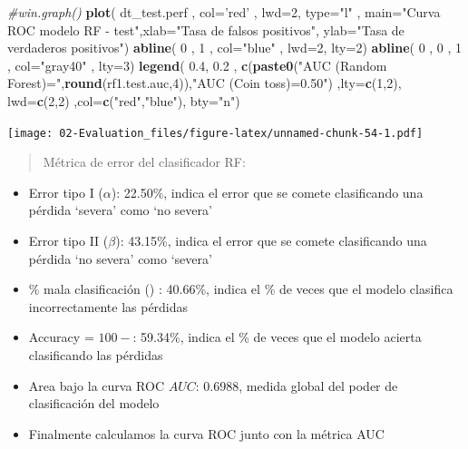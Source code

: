 \documentclass[]{book}
\newenvironment{Shaded}{\begin{snugshade}}{\end{snugshade}}
\newcommand{\CommentTok}[1]{\textcolor[rgb]{0.56,0.35,0.01}{\textit{#1}}}
\newcommand{\DataTypeTok}[1]{\textcolor[rgb]{0.13,0.29,0.53}{#1}}
\newcommand{\DecValTok}[1]{\textcolor[rgb]{0.00,0.00,0.81}{#1}}
\newcommand{\FloatTok}[1]{\textcolor[rgb]{0.00,0.00,0.81}{#1}}
\newcommand{\KeywordTok}[1]{\textcolor[rgb]{0.13,0.29,0.53}{\textbf{#1}}}
\newcommand{\NormalTok}[1]{#1}
\newcommand{\StringTok}[1]{\textcolor[rgb]{0.31,0.60,0.02}{#1}}
\providecommand{\tightlist}{%
  \setlength{\itemsep}{0pt}\setlength{\parskip}{0pt}}
\begin{document}
\begin{Shaded}
\begin{Highlighting}[]
\CommentTok{#win.graph()}
\KeywordTok{plot}\NormalTok{( dt_test.perf , }\DataTypeTok{col=}\StringTok{'red'}\NormalTok{ , }\DataTypeTok{lwd=}\DecValTok{2}\NormalTok{, }\DataTypeTok{type=}\StringTok{"l"}\NormalTok{ , }\DataTypeTok{main=}\StringTok{"Curva ROC modelo RF - test"}\NormalTok{,}\DataTypeTok{xlab=}\StringTok{"Tasa de falsos positivos"}\NormalTok{, }\DataTypeTok{ylab=}\StringTok{"Tasa de verdaderos positivos"}\NormalTok{)}
\KeywordTok{abline}\NormalTok{( }\DecValTok{0}\NormalTok{ , }\DecValTok{1}\NormalTok{  , }\DataTypeTok{col=}\StringTok{"blue"}\NormalTok{ , }\DataTypeTok{lwd=}\DecValTok{2}\NormalTok{, }\DataTypeTok{lty=}\DecValTok{2}\NormalTok{)}
\KeywordTok{abline}\NormalTok{( }\DecValTok{0}\NormalTok{ , }\DecValTok{0}\NormalTok{ , }\DecValTok{1}\NormalTok{ , }\DataTypeTok{col=}\StringTok{"gray40"}\NormalTok{   , }\DataTypeTok{lty=}\DecValTok{3}\NormalTok{)}
\KeywordTok{legend}\NormalTok{( }\FloatTok{0.4}\NormalTok{, }\FloatTok{0.2}\NormalTok{ , }\KeywordTok{c}\NormalTok{(}\KeywordTok{paste0}\NormalTok{(}\StringTok{"AUC (Random Forest)="}\NormalTok{,}\KeywordTok{round}\NormalTok{(rf1.test.auc,}\DecValTok{4}\NormalTok{)),}\StringTok{"AUC (Coin toss)=0.50"}\NormalTok{) ,}\DataTypeTok{lty=}\KeywordTok{c}\NormalTok{(}\DecValTok{1}\NormalTok{,}\DecValTok{2}\NormalTok{), }\DataTypeTok{lwd=}\KeywordTok{c}\NormalTok{(}\DecValTok{2}\NormalTok{,}\DecValTok{2}\NormalTok{) ,}\DataTypeTok{col=}\KeywordTok{c}\NormalTok{(}\StringTok{"red"}\NormalTok{,}\StringTok{"blue"}\NormalTok{), }\DataTypeTok{bty=}\StringTok{"n"}\NormalTok{)}
\end{Highlighting}
\end{Shaded}

\texttt{[image: 02-Evaluation\_files/figure-latex/unnamed-chunk-54-1.pdf]}

\begin{quote}
Métrica de error del clasificador RF:
\end{quote}

\begin{itemize}
\tightlist
\item
  Error tipo I (\(\alpha\)): 22.50\%, indica el error que se comete clasificando una pérdida `severa' como `no severa'
\item
  Error tipo II (\(\beta\)): 43.15\%, indica el error que se comete clasificando una pérdida `no severa' como `severa'
\item
  \% mala clasificación (\(%
  \)) : 40.66\%, indica el \% de veces que el modelo clasifica incorrectamente las pérdidas
\item
  Accuracy = \(100 - %
  \): 59.34\%, indica el \% de veces que el modelo acierta clasificando las pérdidas
\item
  Area bajo la curva ROC \(AUC\): 0.6988, medida global del poder de clasificación del modelo
\item
  Finalmente calculamos la curva ROC junto con la métrica AUC
\end{itemize}
\end{document}

